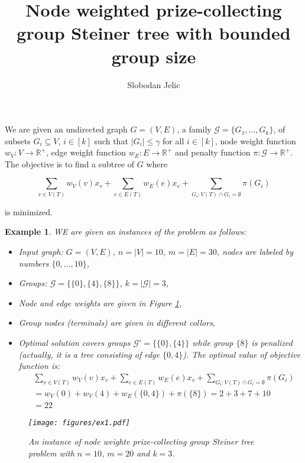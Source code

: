 \documentclass[a4paper,11pt]{article}
\title{Node weighted prize-collecting group Steiner tree with bounded group size}
\author{Slobodan Jelic}
\newtheorem{example}[section]{Example}
\begin{document}
\maketitle

We are given an undirected graph $G=\left(V,E\right)$, a family $\mathcal{G}=\{G_1,\ldots,G_k\}$, of subsets $G_i\subseteq V$, $i\in\left[k\right]$ such that $\left|G_i\right|\le\gamma$ for all $i\in\left[k\right]$, node weight function $w_V:V\rightarrow\mathbb{R}^+$, edge weight function $w_E:E\rightarrow\mathbb{R}^+$ and penalty function $\pi:\mathcal{G}\rightarrow\mathbb{R}^+$. The objective is to find a subtree of $G$ where

$$\sum_{v\in V\left(T\right)}{w_V\left(v\right)x_v}+\sum_{e\in E\left(T\right)}{w_E\left(e\right)x_v}+\sum_{G_i:V\left(T\right)\cap G_i=\emptyset}\pi\left(G_i\right)$$

is minimized.

\begin{example} WE are given an instances of the problem as follows:
    \begin{itemize}
        \item Input graph: $G=(V,E)$, $n=|V|=10$, $m=|E|=30$, nodes are labeled by numbers $\{0,\ldots,10\}$,
        \item Groups: $\mathcal{G}=\{\{0\},\{4\},\{8\}\}$, $k=|\mathcal{G}|=3$,
        \item Node and edge weights are given in Figure \ref{fig01},
        \item Group nodes (terminals) are given in different collors,
        \item Optimal solution covers groups $\mathcal{G}'=\{\{0\},\{4\}\}$ while group $\{8\}$ is penalized (actually, it is a tree consisting of edge $\{0,4\}$). The optimal value of objective function is:
        \begin{align*}
            &\sum_{v\in V\left(T\right)}{w_V\left(v\right)x_v}+\sum_{e\in E\left(T\right)}{w_E\left(e\right)x_v}+\sum_{G_i:V\left(T\right)\cap G_i=\emptyset}\pi\left(G_i\right)\\
            &=w_V(0) + w_V(4) + w_E(\{0,4\}) + \pi(\{8\}) = 2 + 3 +7 + 10\\
            &=22
            \end{align*}
        \end{itemize}
    \begin{figure}
        \texttt{[image: figures/ex1.pdf]}
        \caption{An instance of node weighte prize-collecting group Steiner tree problem with $n=10$, $m=20$ and $k=3$.}\label{fig01}
    \end{figure}
\end{example}
\end{document}
